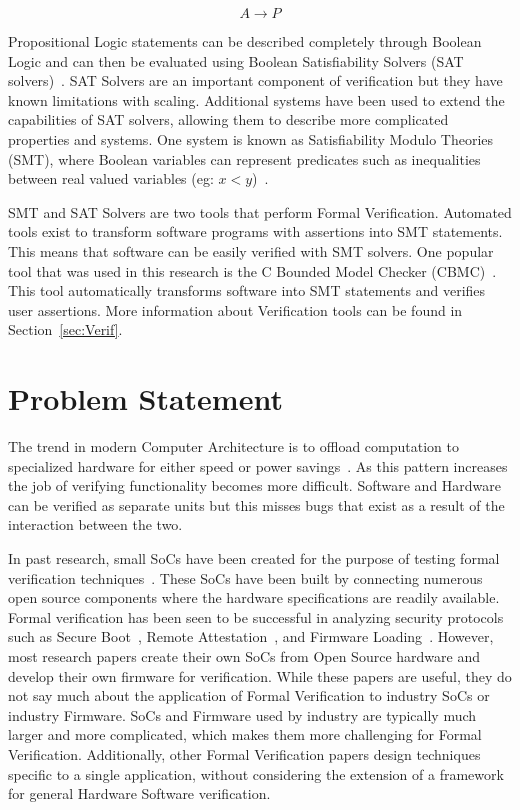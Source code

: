 \begin{equation}
    A \to P
\end{equation}

Propositional Logic statements can be described completely
through Boolean Logic and can then be evaluated using Boolean Satisfiability
Solvers (SAT solvers)~\cite{validating-sat}. 
SAT Solvers are an important component of verification but they have known limitations with scaling.
Additional systems have been used to extend the capabilities of SAT solvers, allowing them to describe more complicated properties and systems. 
One system is known as Satisfiability Modulo Theories (SMT), where 
Boolean variables can represent predicates such as inequalities between real valued variables (eg:
$x < y$)~\cite{smt}. 

SMT and SAT Solvers are two tools that perform Formal Verification. 
Automated tools exist to transform software programs with assertions into SMT statements.
This means that software can be easily verified with SMT solvers.
One popular tool that was used in this research is the C Bounded Model Checker (CBMC)~\cite{cbmc}. 
This tool automatically transforms software into SMT statements and verifies
user assertions.
More information about Verification tools can be found in
Section~\ref{sec:Verif}. 

\section{Problem Statement}

The trend in modern Computer Architecture is to offload computation to specialized hardware for either speed or power savings~\cite{hardware-accel}.
As this pattern increases the job of verifying functionality becomes more difficult.
Software and Hardware can be verified as separate units but this misses bugs
that exist as a result of the interaction between the two.

In past research, small SoCs have been created for the purpose of testing formal verification techniques~\cite{elane}.
These SoCs have been built by connecting numerous open source components where the hardware specifications are readily available.
Formal verification has been seen to be successful in analyzing security
protocols such as Secure Boot~\cite{elane}, Remote
Attestation~\cite{trustfound}, and Firmware Loading~\cite{load-protocol}. 
However, most research papers create their own SoCs from Open Source hardware
and develop their own firmware for verification.
While these papers are useful, they do not say much about the application of
Formal Verification to industry SoCs or industry Firmware.
SoCs and Firmware used by industry are typically much larger and more
complicated, which makes them more challenging for Formal Verification.
Additionally, other Formal Verification papers design techniques specific to a
single application, without considering the extension of a framework for
general Hardware Software verification.

